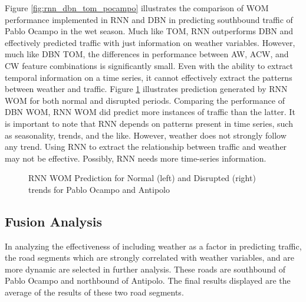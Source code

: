 Figure \ref{fig:rnn_dbn_tom_pocampo} illustrates the comparison of WOM performance implemented in RNN and DBN in predicting southbound traffic of Pablo Ocampo in the wet season. Much like TOM, RNN outperforms DBN and effectively predicted traffic with just information on weather variables. However, much like DBN TOM, the differences in performance between AW, ACW, and CW feature combinations is significantly small. Even with the ability to extract temporal information on a time series, it cannot effectively extract the patterns between weather and traffic. Figure \ref{fig:RNN_WOM_normal_disrption_pocampo_antipolo_wet} illustrates prediction generated by RNN WOM for both normal and disrupted periods. Comparing the performance of DBN WOM, RNN WOM did predict more instances of traffic than the latter. It is important to note that RNN depends on patterns present in time series, such as seasonality, trends, and the like. However, weather does not strongly follow any trend. Using RNN to extract the relationship between traffic and weather may not be effective. Possibly, RNN needs more time-series information. 

\begin{figure}[h]
  \centering
  \captionsetup{justification=centering}
  \caption{RNN WOM Prediction for Normal (left) and Disrupted (right) trends for Pablo Ocampo and Antipolo}
  \label{fig:RNN_WOM_normal_disrption_pocampo_antipolo_wet}
\end{figure}

\subsection{Fusion Analysis}
In analyzing the effectiveness of including weather as a factor in predicting traffic, the road segments which are strongly correlated with weather variables, and are more dynamic are selected in further analysis. These roads are southbound of Pablo Ocampo and northbound of Antipolo. The final results displayed are the average of the results of these two road segments.

